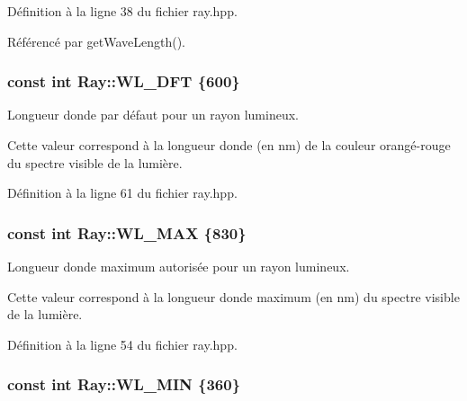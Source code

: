 Définition à la ligne 38 du fichier ray.\+hpp.



Référencé par get\+Wave\+Length().

\hypertarget{classRay_af4176c69ef62ea83bf84b40d7e1c5560}{}
\subsubsection[{W\+L\+\_\+\+D\+F\+T}]{\setlength{\rightskip}{0pt plus 5cm}const int Ray\+::\+W\+L\+\_\+\+D\+F\+T \{600\}\hspace{0.3cm}{\ttfamily [static]}}\label{classRay_af4176c69ef62ea83bf84b40d7e1c5560}


Longueur d\textquotesingle{}onde par défaut pour un rayon lumineux. 

Cette valeur correspond à la longueur d\textquotesingle{}onde (en nm) de la couleur orangé-\/rouge du spectre visible de la lumière. 

Définition à la ligne 61 du fichier ray.\+hpp.

\hypertarget{classRay_add278b4978966f54e3c22e8be2224b7f}{}
\subsubsection[{W\+L\+\_\+\+M\+A\+X}]{\setlength{\rightskip}{0pt plus 5cm}const int Ray\+::\+W\+L\+\_\+\+M\+A\+X \{830\}\hspace{0.3cm}{\ttfamily [static]}}\label{classRay_add278b4978966f54e3c22e8be2224b7f}


Longueur d\textquotesingle{}onde maximum autorisée pour un rayon lumineux. 

Cette valeur correspond à la longueur d\textquotesingle{}onde maximum (en nm) du spectre visible de la lumière. 

Définition à la ligne 54 du fichier ray.\+hpp.

\hypertarget{classRay_a478177dabc9f1a3a0ba7d8b388a58b7e}{}
\subsubsection[{W\+L\+\_\+\+M\+I\+N}]{\setlength{\rightskip}{0pt plus 5cm}const int Ray\+::\+W\+L\+\_\+\+M\+I\+N \{360\}\hspace{0.3cm}{\ttfamily [static]}}\label{classRay_a478177dabc9f1a3a0ba7d8b388a58b7e}


